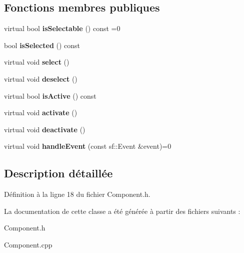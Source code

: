 \subsection*{Fonctions membres publiques}
\begin{DoxyCompactItemize}
\item 
\hypertarget{class_g_u_i_1_1_component_a44d14506c9a1dbc839e05a6bf99c341b}{}\label{class_g_u_i_1_1_component_a44d14506c9a1dbc839e05a6bf99c341b} 
virtual bool {\bfseries is\+Selectable} () const =0
\item 
\hypertarget{class_g_u_i_1_1_component_a456e20a33a9ee778b0eda2641147724e}{}\label{class_g_u_i_1_1_component_a456e20a33a9ee778b0eda2641147724e} 
bool {\bfseries is\+Selected} () const
\item 
\hypertarget{class_g_u_i_1_1_component_ad0f7d6cc692edf2b0e426bfbd584be45}{}\label{class_g_u_i_1_1_component_ad0f7d6cc692edf2b0e426bfbd584be45} 
virtual void {\bfseries select} ()
\item 
\hypertarget{class_g_u_i_1_1_component_aa37424b238293bb308d357cf3b35c81f}{}\label{class_g_u_i_1_1_component_aa37424b238293bb308d357cf3b35c81f} 
virtual void {\bfseries deselect} ()
\item 
\hypertarget{class_g_u_i_1_1_component_a86d906696a080742900b8ead67a2ae3b}{}\label{class_g_u_i_1_1_component_a86d906696a080742900b8ead67a2ae3b} 
virtual bool {\bfseries is\+Active} () const
\item 
\hypertarget{class_g_u_i_1_1_component_a965823e0e62612a7e532eb8c0b98861d}{}\label{class_g_u_i_1_1_component_a965823e0e62612a7e532eb8c0b98861d} 
virtual void {\bfseries activate} ()
\item 
\hypertarget{class_g_u_i_1_1_component_a8964087afef859c015fb8188e619aa81}{}\label{class_g_u_i_1_1_component_a8964087afef859c015fb8188e619aa81} 
virtual void {\bfseries deactivate} ()
\item 
\hypertarget{class_g_u_i_1_1_component_aacf5e981e7b5726f5c7e9436455660ba}{}\label{class_g_u_i_1_1_component_aacf5e981e7b5726f5c7e9436455660ba} 
virtual void {\bfseries handle\+Event} (const sf\+::\+Event \&event)=0
\end{DoxyCompactItemize}


\subsection{Description détaillée}


Définition à la ligne 18 du fichier Component.\+h.



La documentation de cette classe a été générée à partir des fichiers suivants \+:\begin{DoxyCompactItemize}
\item 
Component.\+h\item 
Component.\+cpp\end{DoxyCompactItemize}
